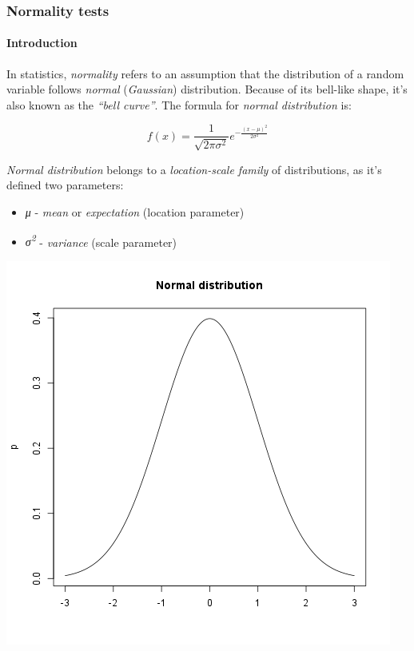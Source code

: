 \documentclass[]{article}
\makeatletter
\def\maxwidth{\ifdim\Gin@nat@width>\linewidth\linewidth
\else\Gin@nat@width\fi}
\let\Oldincludegraphics\includegraphics
\renewcommand{\includegraphics}[1]{\Oldincludegraphics[width=\maxwidth]{#1}}
\makeatother
\begin{document}
\subsubsection{Normality tests}

\paragraph{Introduction}

In statistics, \emph{normality} refers to an assumption that the
distribution of a random variable follows \emph{normal}
(\emph{Gaussian}) distribution. Because of its bell-like shape, it's
also known as the \emph{``bell curve''}. The formula for \emph{normal
distribution} is:

\[f(x) = \frac{1}{\sqrt{2\pi{}\sigma{}^2}} e^{-\frac{(x-\mu{})^2}{2\sigma{}^2}}\]

\emph{Normal distribution} belongs to a \emph{location-scale family} of
distributions, as it's defined two parameters:

\begin{itemize}
\item
  \emph{μ} - \emph{mean} or \emph{expectation} (location parameter)
\item
  \emph{σ\textsuperscript{2}} - \emph{variance} (scale parameter)
\end{itemize}
\href{806ea97c59e1a12d4acae4968957aaa9-hires.png}{\includegraphics{806ea97c59e1a12d4acae4968957aaa9.png}}
\end{document}
